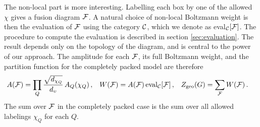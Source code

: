 The non-local part is more interesting. Labelling each box by one of the allowed $\chi$ gives a fusion diagram ${\cal F}$.
A natural choice of non-local Boltzmann weight is then the evaluation of ${\cal F}$ using the category ${\cal C}$, which we denote as eval${}_{\cal C}[{\cal F}]$.
The procedure to compute the evaluation is described in section \ref{sec:evaluation}.
The result depends only on the topology of the diagram, and is central to the power of our approach. 
The amplitude for each ${\cal F}$, its full Boltzmann weight, and the partition function for the completely packed model are therefore
\begin{align}
	A({\cal F}) &= \prod_Q \frac{\sqrt{d_{\chi_Q}}}{d_\upsilon} \, A_{Q}(\chi_Q) \,,
&	W({\cal F}) &= A({\cal F}) \operatorname{eval}_{\mathcal{C}}[{\cal F}] \,,
&	Z_{\rm geo}(G) &= \sum_{\cal F} W({\cal F}) \,.
	\label{ZW}
\end{align}
The sum over ${\cal F}$ in the completely packed case is the sum over all allowed labelings $\chi_Q$ for each $Q$.



